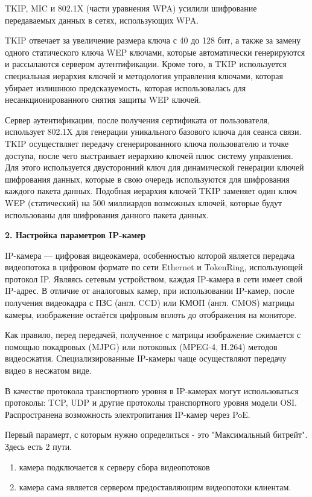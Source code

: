 \documentclass[12pt]{article}
\begin{document}
TKIP, MIC и 802.1X (части уравнения WPA) усилили шифрование передаваемых данных в сетях, использующих WPA.

TKIP отвечает за увеличение размера ключа с 40 до 128 бит, а также за замену одного статического ключа WEP ключами, которые автоматически генерируются и рассылаются сервером аутентификации. Кроме того, в TKIP используется специальная иерархия ключей и методология управления ключами, которая убирает излишнюю предсказуемость, которая использовалась для несанкционированного снятия защиты WEP ключей.

Сервер аутентификации, после получения сертификата от пользователя, использует 802.1X для генерации уникального базового ключа для сеанса связи. TKIP осуществляет передачу сгенерированного ключа пользователю и точке доступа, после чего выстраивает иерархию ключей плюс систему управления. Для этого используется двусторонний ключ для динамической генерации ключей шифрования данных, которые в свою очередь используются для шифрования каждого пакета данных. Подобная иерархия ключей TKIP заменяет один ключ WEP (статический) на 500 миллиардов возможных ключей, которые будут использованы для шифрования данного пакета данных.

{\bf 2. Настройка параметров IP-камер}

IP-камера — цифровая видеокамера, особенностью которой является передача видеопотока в цифровом формате по сети Ethernet и TokenRing, использующей протокол IP. Являясь сетевым устройством, каждая IP-камера в сети имеет свой IP-адрес.
В отличие от аналоговых камер, при использовании IP-камер, после получения видеокадра с ПЗС (англ. CCD) или КМОП (англ. CMOS) матрицы камеры, изображение остаётся цифровым вплоть до отображения на мониторе.

Как правило, перед передачей, полученное с матрицы изображение сжимается с помощью покадровых (MJPG) или потоковых (MPEG-4, H.264) методов видеосжатия. Специализированные IP-камеры чаще осуществляют передачу видео в несжатом виде.

В качестве протокола транспортного уровня в IP-камерах могут использоваться протоколы: TCP, UDP и другие протоколы транспортного уровня модели OSI. Распространена возможность электропитания IP-камер через PoE. 

Первый парамерт, с которым нужно определиться - это "Максимальный битрейт". Здесь есть 2 пути. 
\begin{enumerate}
\item камера подключается к серверу сбора видеопотоков
\item камера сама является сервером предоставляющим видеопотоки клиентам.
\end{enumerate}
\end{document}

